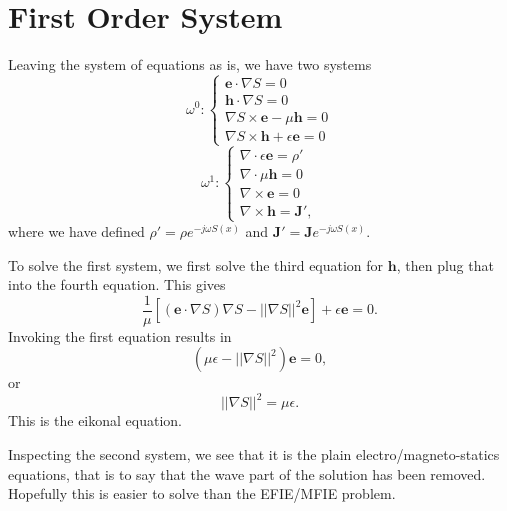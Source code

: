 \documentclass{article}
\newcommand{\norm}[1]{||#1||}
\newcommand{\Div}[0]{\nabla\cdot}
\newcommand{\Curl}[0]{\nabla\times}
\theoremstyle{plain}
\begin{document}
\section{First Order System}

Leaving the system of equations as is, we have two systems
\begin{equation}
	\omega^0:
	\begin{cases}
		\mathbf{e}\cdot\nabla S = 0 \\
		\mathbf{h}\cdot\nabla S = 0 \\
		\nabla S\times\mathbf{e} - \mu\mathbf{h} = 0 \\
		\nabla S\times\mathbf{h} + \epsilon\mathbf{e} = 0
	\end{cases}
\end{equation}
\begin{equation}
	\omega^1:
	\begin{cases}
		\Div\epsilon\mathbf{e} = \rho' \\
		\Div\mu\mathbf{h} = 0 \\
		\Curl\mathbf{e} = 0 \\
		\Curl\mathbf{h} = \mathbf{J}',
	\end{cases}
\end{equation}
where we have defined $\rho' = \rho e^{-j\omega S(x)}$ and $\mathbf{J}' = \mathbf{J}e^{-j\omega S(x)}$.

To solve the first system, we first solve the third equation for $\mathbf{h}$, then plug that into the fourth equation. This gives
\begin{equation}
	\frac{1}{\mu}\left[ \left(\mathbf{e}\cdot\nabla S\right)\nabla S - \norm{\nabla S}^2\mathbf{e}\right] + \epsilon\mathbf{e} = 0.
\end{equation}
Invoking the first equation results in
\begin{equation}
	\left(\mu\epsilon - \norm{\nabla S}^2\right)\mathbf{e} = 0,
\end{equation}
or
\begin{equation}
	\norm{\nabla S}^2 = \mu\epsilon.
\end{equation}
This is the eikonal equation.

Inspecting the second system, we see that it is the plain electro/magneto-statics equations, that is to say that the wave part of the solution has been removed. Hopefully this is easier to solve than the EFIE/MFIE problem.
\end{document}
